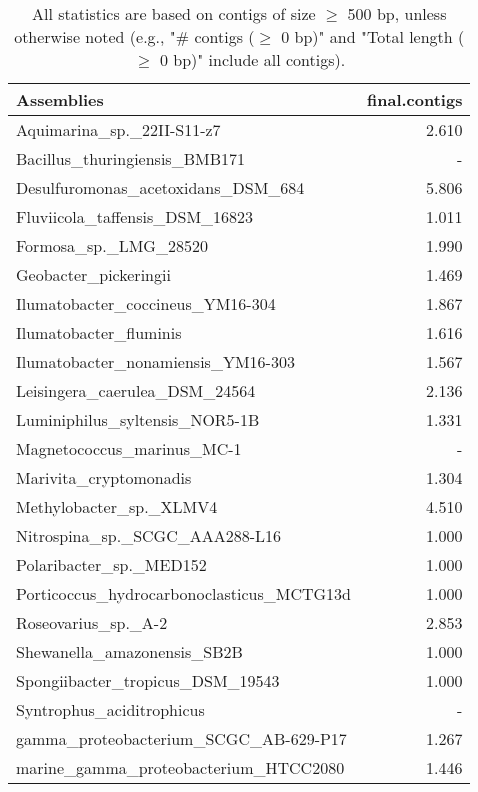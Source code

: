 \documentclass[12pt,a4paper]{article}
\begin{document}
\begin{table}[ht]
\begin{center}
\caption{All statistics are based on contigs of size $\geq$ 500 bp, unless otherwise noted (e.g., "\# contigs ($\geq$ 0 bp)" and "Total length ($\geq$ 0 bp)" include all contigs).}
\begin{tabular}{|l*{1}{|r}|}
\hline
Assemblies & final.contigs \\ \hline
Aquimarina\_sp.\_22II-S11-z7 & 2.610 \\ \hline
Bacillus\_thuringiensis\_BMB171 & - \\ \hline
Desulfuromonas\_acetoxidans\_DSM\_684 & 5.806 \\ \hline
Fluviicola\_taffensis\_DSM\_16823 & 1.011 \\ \hline
Formosa\_sp.\_LMG\_28520 & 1.990 \\ \hline
Geobacter\_pickeringii & 1.469 \\ \hline
Ilumatobacter\_coccineus\_YM16-304 & 1.867 \\ \hline
Ilumatobacter\_fluminis & 1.616 \\ \hline
Ilumatobacter\_nonamiensis\_YM16-303 & 1.567 \\ \hline
Leisingera\_caerulea\_DSM\_24564 & 2.136 \\ \hline
Luminiphilus\_syltensis\_NOR5-1B & 1.331 \\ \hline
Magnetococcus\_marinus\_MC-1 & - \\ \hline
Marivita\_cryptomonadis & 1.304 \\ \hline
Methylobacter\_sp.\_XLMV4 & 4.510 \\ \hline
Nitrospina\_sp.\_SCGC\_AAA288-L16 & 1.000 \\ \hline
Polaribacter\_sp.\_MED152 & 1.000 \\ \hline
Porticoccus\_hydrocarbonoclasticus\_MCTG13d & 1.000 \\ \hline
Roseovarius\_sp.\_A-2 & 2.853 \\ \hline
Shewanella\_amazonensis\_SB2B & 1.000 \\ \hline
Spongiibacter\_tropicus\_DSM\_19543 & 1.000 \\ \hline
Syntrophus\_aciditrophicus & - \\ \hline
gamma\_proteobacterium\_SCGC\_AB-629-P17 & 1.267 \\ \hline
marine\_gamma\_proteobacterium\_HTCC2080 & 1.446 \\ \hline
\end{tabular}
\end{center}
\end{table}
\end{document}

